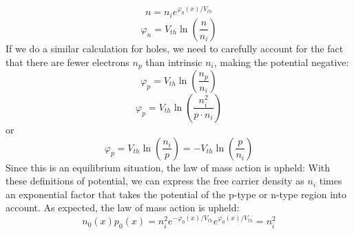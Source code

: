    \begin{equation} 
        {n} = {n_i}{e^{{\varphi _0}(x)/{V_{th}}}} 
    \end{equation}
    \begin{equation} 
        \varphi_n = V_{th} \ln\left( \frac{n}{n_i}  \right)
    \end{equation}
If we do a similar calculation for holes, we need to carefully account for the fact that there are fewer electrons $n_p$ than intrinsic $n_i$, making the potential negative:
    \begin{equation} 
        \varphi_p = V_{th} \ln\left( \frac{n_p}{n_i}  \right)
    \end{equation}
    \begin{equation} 
        \varphi_p = V_{th} \ln\left( \frac{n_i^2}{p \cdot n_i}  \right)
    \end{equation}
or
    \begin{equation} 
        \varphi_p = V_{th} \ln\left( \frac{n_i}{p}  \right) = - V_{th} \ln\left( \frac{p}{n_i}  \right) 
    \end{equation}
Since this is an equilibrium situation, the law of mass action is upheld:
With these definitions of potential, we can express the free carrier density as $n_i$ times an exponential factor that takes the potential of the p-type or n-type region into account.  As expected, the law of mass action is upheld:
    \begin{equation} 
        {n_0}(x){p_0}(x) = n_i^2{e^{ - {\varphi _0}(x)/{V_{th}}}}{e^{{\varphi _0}(x)/{V_{th}}}} = n_i^2 
    \end{equation}

